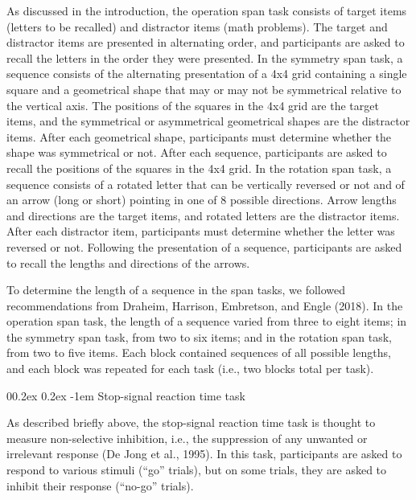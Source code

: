 \documentclass[
  man,floatsintext]{apa6}
\makeatletter
\let\oldparagraph\paragraph
\renewcommand{\paragraph}[1]{\oldparagraph{#1}\mbox{}}
\renewcommand{\paragraph}{\@startsection{paragraph}{4}{\parindent}%
  {0\baselineskip \@plus 0.2ex \@minus 0.2ex}%
  {-1em}%
  {\normalfont\normalsize\bfseries\itshape\typesectitle}}
\makeatother
\begin{document}
As discussed in the introduction, the operation span task consists of target items (letters to be recalled) and distractor items (math problems). The target and distractor items are presented in alternating order, and participants are asked to recall the letters in the order they were presented. In the symmetry span task, a sequence consists of the alternating presentation of a 4x4 grid containing a single square and a geometrical shape that may or may not be symmetrical relative to the vertical axis. The positions of the squares in the 4x4 grid are the target items, and the symmetrical or asymmetrical geometrical shapes are the distractor items. After each geometrical shape, participants must determine whether the shape was symmetrical or not. After each sequence, participants are asked to recall the positions of the squares in the 4x4 grid. In the rotation span task, a sequence consists of a rotated letter that can be vertically reversed or not and of an arrow (long or short) pointing in one of 8 possible directions. Arrow lengths and directions are the target items, and rotated letters are the distractor items. After each distractor item, participants must determine whether the letter was reversed or not. Following the presentation of a sequence, participants are asked to recall the lengths and directions of the arrows.

To determine the length of a sequence in the span tasks, we followed recommendations from Draheim, Harrison, Embretson, and Engle (2018). In the operation span task, the length of a sequence varied from three to eight items; in the symmetry span task, from two to six items; and in the rotation span task, from two to five items. Each block contained sequences of all possible lengths, and each block was repeated for each task (i.e., two blocks total per task).

\hypertarget{stop-signal-reaction-time-task}{%
\paragraph{Stop-signal reaction time task}\label{stop-signal-reaction-time-task}}

As described briefly above, the stop-signal reaction time task is thought to measure non-selective inhibition, i.e., the suppression of any unwanted or irrelevant response (De Jong et al., 1995). In this task, participants are asked to respond to various stimuli (``go'' trials), but on some trials, they are asked to inhibit their response (``no-go'' trials).
\end{document}
